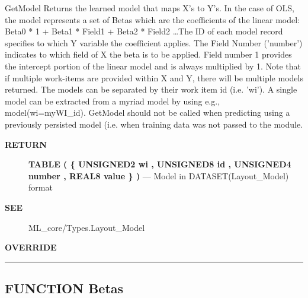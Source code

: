 \par





GetModel Returns the learned model that maps X's to Y's. In the case of OLS, the model represents a set of Betas which are the coefficients of the linear model: Beta0 * 1 + Beta1 * Field1 + Beta2 * Field2 \ldots The ID of each model record specifies to which Y variable the coefficient applies. The Field Number ('number') indicates to which field of X the beta is to be applied. Field number 1 provides the intercept portion of the linear model and is always multiplied by 1. Note that if multiple work-items are provided within X and Y, there will be multiple models returned. The models can be separated by their work item id (i.e. 'wi'). A single model can be extracted from a myriad model by using e.g., model(wi=myWI\_id). GetModel should not be called when predicting using a previously persisted model (i.e. when training data was not passed to the module.








\par
\begin{description}
\item [\colorbox{tagtype}{\color{white} \textbf{\textsf{RETURN}}}] \textbf{TABLE ( \{ UNSIGNED2 wi , UNSIGNED8 id , UNSIGNED4 number , REAL8 value \} )} --- Model in DATASET(Layout\_Model) format
\end{description}






\par
\begin{description}
\item [\colorbox{tagtype}{\color{white} \textbf{\textsf{SEE}}}] ML\_core/Types.Layout\_Model
\end{description}






\par
\begin{description}
\item [\colorbox{tagtype}{\color{white} \textbf{\textsf{OVERRIDE}}}] 
\end{description}



\rule{\linewidth}{0.5pt}
\subsection*{\textsf{\colorbox{headtoc}{\color{white} FUNCTION}
Betas}}

